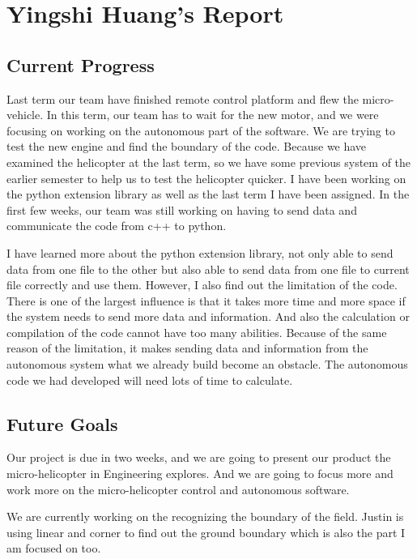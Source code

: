 \documentclass[onecolumn, draftclsnofoot,10pt, compsoc]{IEEEtran}
\begin{document}
\section{Yingshi Huang's Report}

\subsection{Current Progress}

Last term our team have finished remote control platform and flew the micro-vehicle. In this term, our team has to wait for the new motor, and we were focusing on working on the autonomous part of the software. We are trying to test the new engine and find the boundary of the code. Because we have examined the helicopter at the last term, so we have some previous system of the earlier semester to help us to test the helicopter quicker. I have been working on the python extension library as well as the last term I have been assigned. In the first few weeks, our team was still working on having to send data and communicate the code from c++ to python.

I have learned more about the python extension library, not only able to send data from one file to the other but also able to send data from one file to current file correctly and use them. However, I also find out the limitation of the code. There is one of the largest influence is that it takes more time and more space if the system needs to send more data and information. And also the calculation or compilation of the code cannot have too many abilities. Because of the same reason of the limitation, it makes sending data and information from the autonomous system what we already build become an obstacle. The autonomous code we had developed will need lots of time to calculate.


\subsection{Future Goals}

Our project is due in two weeks, and we are going to present our product the micro-helicopter in Engineering explores. And we are going to focus more and work more on the micro-helicopter control and autonomous software.

We are currently working on the recognizing the boundary of the field. Justin is using linear and corner to find out the ground boundary which is also the part I am focused on too.
\end{document}
